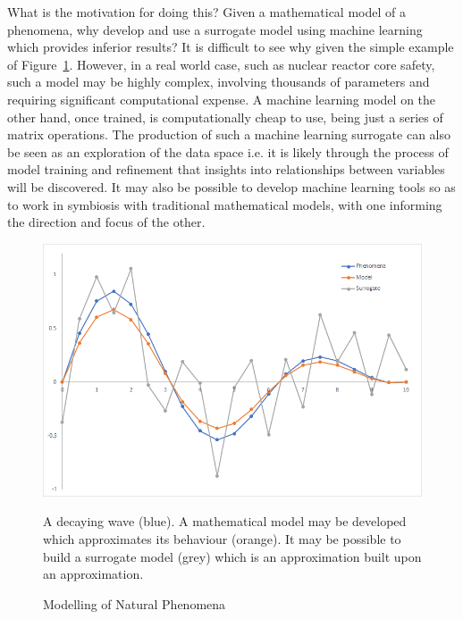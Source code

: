 \noindent
What is the motivation for doing this? Given a mathematical model of a phenomena, why develop and use a surrogate model using machine learning which provides inferior results? It is difficult to see why given the simple example of Figure~\ref{fig:surrogate}. However, in a real world case, such as nuclear reactor core safety, such a model may be highly complex, involving thousands of parameters and requiring significant computational expense. A machine learning model on the other hand, once trained, is computationally cheap to use, being just a series of matrix operations. The production of such a machine learning surrogate can also be seen as an exploration of the data space i.e. it is likely through the process of model training and refinement that insights into relationships between variables will be discovered. It may also be possible to develop machine learning tools so as to work in symbiosis with traditional mathematical models, with one informing the direction and focus of the other.
\\

\begin{figure}[p]
	\centering
	\includegraphics[scale=0.65]{Figures/surrogate_model.png}
	\caption{Modelling of Natural Phenomena} {A decaying wave (blue). A mathematical model may be developed which approximates its behaviour (orange). It may be possible to build a surrogate model (grey) which is an approximation built upon an approximation.}
	\label{fig:surrogate}
\end{figure}

